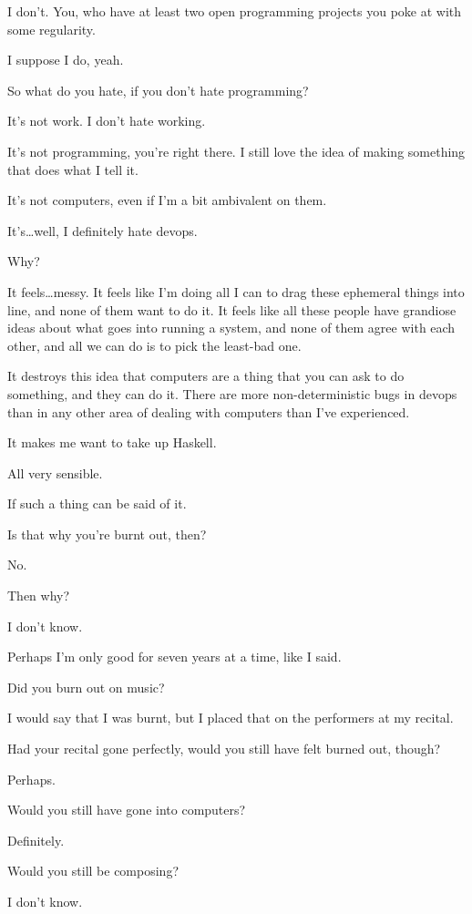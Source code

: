 \begin{ally}
I don't. You, who have at least two open programming projects you poke at with some regularity.
\end{ally}
I suppose I do, yeah.

\begin{ally}
So what do you hate, if you don't hate programming?
\end{ally}
It's not work. I don't hate working.

It's not programming, you're right there. I still love the idea of making something that does what I tell it.

It's not computers, even if I'm a bit ambivalent on them.

It's\ldots{}well, I definitely hate devops.

\begin{ally}
Why?
\end{ally}
It feels\ldots{}messy. It feels like I'm doing all I can to drag these ephemeral things into line, and none of them want to do it. It feels like all these people have grandiose ideas about what goes into running a system, and none of them agree with each other, and all we can do is to pick the least-bad one.

It destroys this idea that computers are a thing that you can ask to do something, and they can do it. There are more non-deterministic bugs in devops than in any other area of dealing with computers than I've experienced.

It makes me want to take up Haskell.

\begin{ally}
All very sensible.
\end{ally}
If such a thing can be said of it.

\begin{ally}
Is that why you're burnt out, then?
\end{ally}
No.

\begin{ally}
Then why?
\end{ally}
I don't know.

Perhaps I'm only good for seven years at a time, like I said.

\begin{ally}
Did you burn out on music?
\end{ally}
I would say that I was burnt, but I placed that on the performers at my recital.

\begin{ally}
Had your recital gone perfectly, would you still have felt burned out, though?
\end{ally}
Perhaps.

\begin{ally}
Would you still have gone into computers?
\end{ally}
Definitely.

\begin{ally}
Would you still be composing?
\end{ally}
I don't know.
\newpage

